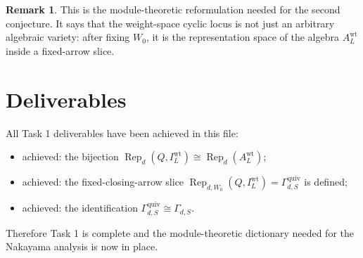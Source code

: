 \documentclass{article}
\newcommand{\Rep}{\operatorname{Rep}}
\theoremstyle{definition}
\newtheorem{remark}[theorem]{Remark}
\begin{document}
\begin{remark}
This is the module-theoretic reformulation needed for the second conjecture.
It says that the weight-space cyclic locus is not just an arbitrary algebraic
variety: after fixing $W_0$, it is the representation space of the algebra
$A_L^{\mathrm{wt}}$ inside a fixed-arrow slice.
\end{remark}

\section{Deliverables}

All Task 1 deliverables have been achieved in this file:

\begin{itemize}
\item achieved: the bijection
  $\Rep_d(Q,I_L^{\mathrm{wt}})\cong \Rep_d(A_L^{\mathrm{wt}})$;
\item achieved: the fixed-closing-arrow slice
  $\Rep_{d,W_0}(Q,I_L^{\mathrm{wt}})=\Gamma_{d,S}^{\mathrm{quiv}}$ is defined;
\item achieved: the identification
  $\Gamma_{d,S}^{\mathrm{quiv}}\cong \Gamma_{d,S}$.
\end{itemize}

Therefore Task 1 is complete and the module-theoretic dictionary needed for the
Nakayama analysis is now in place.
\end{document}
